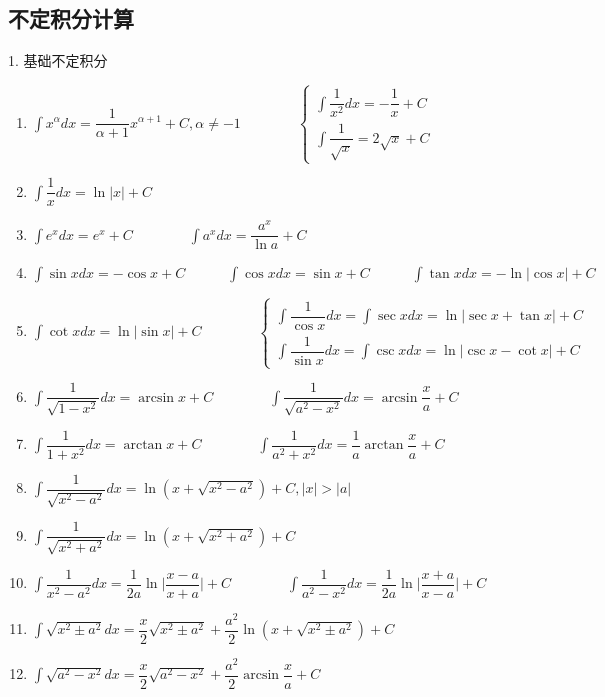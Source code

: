\subsection{不定积分计算}
\begin{theorem}[常用不定积分]
	1. 基础不定积分
	\begin{enumerate}
		\item $\int x^{\alpha}dx = \dfrac{1}{\alpha + 1}x^{\alpha + 1} + C, \alpha\neq -1\qquad \qquad  \begin{cases} \int \dfrac{1}{x^{2}}dx = -\dfrac{1}{x} + C  \\ \int \dfrac{1}{\sqrt{x}} = 2\sqrt{x} +C \end{cases}$
		\item $\int \dfrac{1}{x}dx = \ln |x| +C$
		\item $\int e^{x}dx = e^{x} + C\qquad \qquad \int a^{x}dx = \dfrac{a^{x}}{\ln a} + C$
		\item $\int \sin xdx = -\cos x + C \quad \qquad \int \cos xdx  =\sin x +C \quad \qquad \int \tan xdx = -\ln |\cos x| + C$
		\item $\int \cot xdx = \ln|\sin x| + C \qquad \qquad \begin{cases} \int \dfrac{1}{\cos x}dx = \int \sec xdx = \ln |\sec x+\tan x| + C \\ \int\dfrac{1}{\sin x}dx = \int \csc xdx = \ln |\csc x -\cot x| + C  \end{cases}$
		\item $\int \dfrac{1}{\sqrt{1-x^{2}}}dx = \arcsin x + C\qquad \qquad \int \dfrac{1}{\sqrt{a^{2}-x^{2}}}dx = \arcsin \dfrac{x}{a} + C$
		\item $\int \dfrac{1}{1+x^{2}}dx = \arctan x + C\qquad \qquad \int \dfrac{1}{a^{2}+x^{2}}dx = \dfrac{1}{a}\arctan \dfrac{x}{a} + C$
		\item $\int \dfrac{1}{\sqrt{x^{2}-a^{2}}}dx = \ln (x+\sqrt{x^{2}-a^{2}}) + C, |x| > |a|$
		\item $\int \dfrac{1}{\sqrt{x^{2}+a^{2}}}dx = \ln (x+\sqrt{x^{2}+a^{2}}) + C $
		\item $\int \dfrac{1}{x^{2}-a^{2}}dx = \dfrac{1}{2a} \ln \big|\dfrac{x-a}{x+a}\big| + C\qquad \qquad \int \dfrac{1}{a^{2}-x^{2}}dx = \dfrac{1}{2a} \ln \big|\dfrac{x+a}{x-a}\big| + C$
		\item $\int \sqrt{x^{2}\pm a^{2}}dx = \dfrac{x}{2}\sqrt{x^{2}\pm a^{2}}+\dfrac{a^{2}}{2}\ln (x + \sqrt{x^{2}\pm a^{2}}) + C$
		\item $\int \sqrt{a^{2}-x^{2}}dx = \dfrac{x}{2}\sqrt{a^{2}-x^{2}}+\dfrac{a^{2}}{2}\arcsin \dfrac{x}{a} + C$

\end{enumerate}
\end{theorem}
